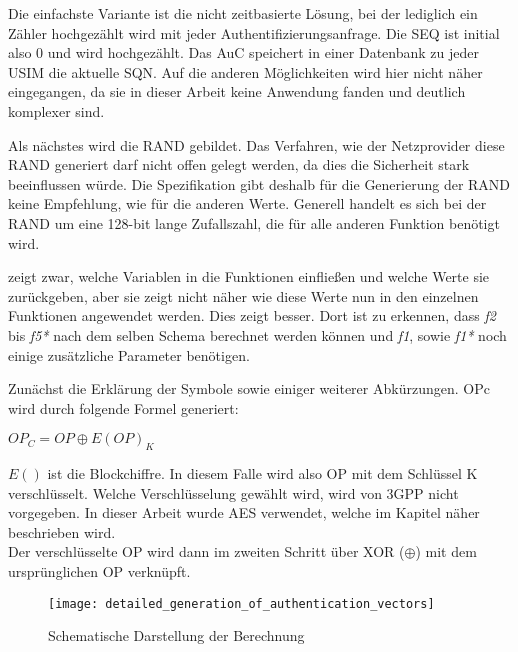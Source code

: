  Die einfachste Variante ist die nicht zeitbasierte Lösung, bei der lediglich ein Zähler hochgezählt
 wird mit jeder Authentifizierungsanfrage. Die SEQ ist initial also 0 und wird hochgezählt. Das
 \ac{AuC} speichert in einer Datenbank \cite{3gpp.33.102} zu jeder USIM die aktuelle SQN.
 Auf die anderen  Möglichkeiten wird hier nicht näher eingegangen, da sie in dieser Arbeit
 keine Anwendung fanden und deutlich komplexer sind.
 
 Als nächstes wird die \ac{RAND} gebildet. Das Verfahren, wie der Netzprovider diese RAND
 generiert darf nicht offen gelegt werden, da dies die Sicherheit stark beeinflussen würde. Die
 Spezifikation gibt deshalb für die Generierung der RAND keine Empfehlung, wie für die anderen
 Werte. Generell handelt es sich bei der RAND um eine 128-bit lange Zufallszahl, die für alle
 anderen Funktion benötigt wird.
 
  zeigt zwar, welche Variablen in die Funktionen einfließen und
 welche Werte sie zurückgeben, aber sie zeigt nicht näher wie diese Werte nun in den einzelnen
 Funktionen angewendet werden. Dies zeigt  besser. Dort ist
 zu erkennen, dass \emph{f2} bis \emph{f5*} nach dem selben Schema berechnet werden können und
 \emph{f1}, sowie \emph{f1*} noch einige zusätzliche Parameter benötigen.
 
 Zunächst die Erklärung der Symbole sowie einiger weiterer Abkürzungen. OPc wird durch
 folgende Formel generiert:
 \begin{center}
  $OP_{C} = OP \oplus E(OP)_{K}$
 \end{center}
 
 $E()$ ist die Blockchiffre. In diesem Falle wird also \ac{OP} mit dem Schlüssel \ac{K}
 verschlüsselt. Welche Verschlüsselung gewählt wird, wird von 3GPP nicht vorgegeben. In
 dieser Arbeit wurde \ac{AES} verwendet, welche im Kapitel  näher beschrieben wird. \\
 Der verschlüsselte OP wird dann im zweiten Schritt über XOR ($\oplus$) mit dem ursprünglichen
 OP verknüpft.
 
 \begin{figure}[ht]
  \begin{center}
   \texttt{[image: detailed\_generation\_of\_authentication\_vectors]}
  \end{center}
  \caption[Schematische Darstellung der Berechnung der Authentifizierungsvektoren]{Schematische Darstellung der Berechnung \cite{3gpp.33.102}}
  \label{fig:schematisch_milenage}
 \end{figure}
 
